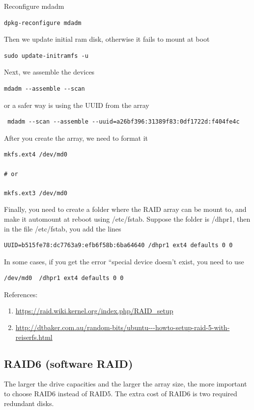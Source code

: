 Reconfigure mdadm
\begin{verbatim}
dpkg-reconfigure mdadm
\end{verbatim}
Then we update initial ram disk, otherwise it fails to mount at boot
\begin{verbatim}
sudo update-initramfs -u
\end{verbatim}

Next, we assemble the devices
\begin{verbatim}
mdadm --assemble --scan 
\end{verbatim}
or a safer way is using the UUID from the array
\begin{verbatim}
 mdadm --scan --assemble --uuid=a26bf396:31389f83:0df1722d:f404fe4c
\end{verbatim}

After you create the array, we need to format it
\begin{verbatim}
mkfs.ext4 /dev/md0

# or

mkfs.ext3 /dev/md0
\end{verbatim}


Finally, you need to create a folder where the RAID array can be mount to, and
make it automount at reboot using /etc/fstab. Suppose the folder is /dhpr1, then
in the file /etc/fstab, you add the lines
\begin{verbatim}
UUID=b515fe78:dc7763a9:efb6f58b:6ba64640 /dhpr1 ext4 defaults 0 0 
\end{verbatim}
In some cases, if you get the error ``special device doesn't exist, you need to
use
\begin{verbatim}
/dev/md0  /dhpr1 ext4 defaults 0 0 
\end{verbatim}

References:
\begin{enumerate}
  \item \url{https://raid.wiki.kernel.org/index.php/RAID_setup}
  \item
  \url{http://dtbaker.com.au/random-bits/ubuntu---howto-setup-raid-5-with-reiserfs.html}
\end{enumerate}



\subsection{RAID6 (software RAID)}

The larger the drive capacities and the larger the array size, the more
important to choose RAID6 instead of RAID5.	The extra cost of RAID6 is two
required redundant disks. 


